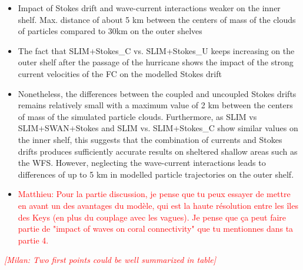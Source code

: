 \documentclass[preprint,12pt,authoryear]{elsarticle}
\newcommand{\emphc}[1]{\emph{\textcolor{red}{#1}}}
\begin{document}
\begin{itemize}
    \item Impact of Stokes drift and wave-current interactions weaker on the inner shelf. Max. distance of about 5 km between the centers of mass of the clouds of particles compared to 30km on the outer shelves
    \item The fact that SLIM+Stokes\_C vs. SLIM+Stokes\_U keeps increasing on the outer shelf after the passage of the hurricane shows the impact of the strong current velocities of the FC on the modelled Stokes drift
    \item Nonetheless, the differences between the coupled and uncoupled Stokes drifts remains relatively small with a maximum value of 2 km between the centers of mass of the simulated particle clouds. Furthermore, as SLIM vs SLIM+SWAN+Stokes and SLIM vs. SLIM+Stokes\_C show similar values on the inner shelf, this suggests that the combination of currents and Stokes drifts produces sufficiently accurate results on sheltered shallow areas such as the WFS. However, neglecting the wave-current interactions leads to differences of up to 5 km in modelled particle trajectories on the outer shelf. 
    \item \textcolor{red}{Matthieu: Pour la partie discussion, je pense que tu peux essayer de mettre en avant un des avantages du modèle, qui est la haute résolution entre les îles des Keys (en plus du couplage avec les vagues). Je pense que ça peut faire partie de "impact of waves on coral connectivity" que tu mentionnes dans ta partie 4.}
\end{itemize}

\emphc{[Milan: Two first points could be well summarized in table]}
\end{document}
